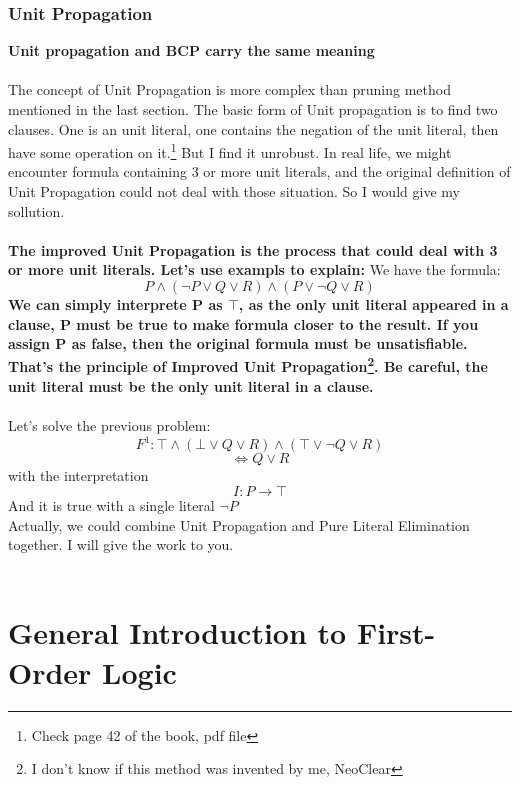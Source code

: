\documentclass{article}
\begin{document}
\subsubsection{Unit Propagation}
\textbf{Unit propagation and BCP carry the same meaning}\\\\
The concept of Unit Propagation is more complex than pruning method mentioned in the last section. The basic form of Unit propagation is to find two clauses. One is an unit literal, one contains the negation of the unit literal, then have some operation on it.\footnote{Check page 42 of the book, pdf file} But I find it unrobust. In real life, we might encounter formula containing 3 or more unit literals, and the original definition of Unit Propagation could not deal with those situation. So I would give my sollution.\\\\
\textbf{The improved Unit Propagation is the process that could deal with 3 or more unit literals. Let's use exampls to explain:}
We have the formula:
$$P \land (\neg P \lor Q \lor R) \land (P \lor \neg Q \lor R)$$
\textbf{We can simply interprete P as $\top$, as the only unit literal appeared in a clause, P must be true to make formula closer to the result. If you assign P as false, then the original formula must be unsatisfiable. That's the principle of Improved Unit Propagation\footnote{I don't know if this method was invented by me, NeoClear}. Be careful, the unit literal must be the only unit literal in a clause.}\\\\
Let's solve the previous problem:
$$F^1: \top \land (\bot \lor Q \lor R) \land (\top \lor \neg Q \lor R)$$
$$\iff Q \lor R$$ with the interpretation $$I: {P \rightarrow \top}$$
And it is true with a single literal $\neg P$\\
Actually, we could combine Unit Propagation and Pure Literal Elimination together. I will give the work to you.\\\\

\section{General Introduction to First-Order Logic}
\end{document}
